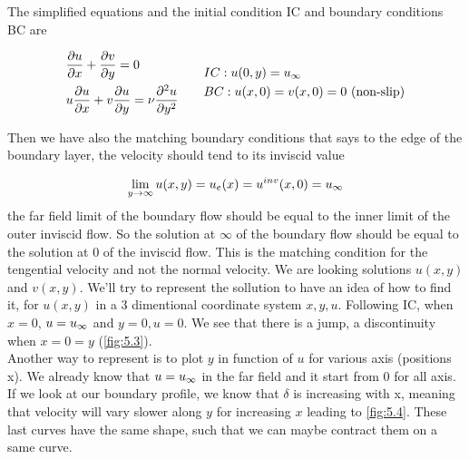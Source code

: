 	\newpage
	The simplified equations and the initial condition IC and boundary conditions BC are
	
	\begin{equation}
	\begin{aligned}
		&\frac{\partial u}{\partial x} + \frac{\partial v}{\partial y} = 0\\
		&u \frac{\partial u}{\partial x} + v \frac{\partial u}{\partial y} = \nu \frac{\partial ^2 u}{\partial y^2}
	\end{aligned}	
	\qquad
	\begin{aligned}
	&IC: u(0,y) = u_\infty\\
	&BC: u(x,0) = v(x,0) = 0 \mbox{ (non-slip)}
	\end{aligned}
	\end{equation}
	
	Then we have also the matching boundary conditions that says to the edge of the boundary layer, the velocity should tend to its inviscid value
	
	\begin{equation}
		\lim _{y\rightarrow \infty} u(x,y) = u_e(x) = u^{inv}(x,0) = u_\infty 
	\end{equation}
	the far field limit of the boundary flow should be equal to the inner limit of the outer inviscid flow. So the solution at $\infty$ of the boundary flow should be equal to the solution at 0 of the inviscid flow. This is the matching condition for the tengential velocity and not the normal velocity. We are looking solutions $u(x,y)$ and $v(x,y)$. We'll try to represent the sollution to have an idea of how to find it, for $u(x,y)$ in a 3 dimentional coordinate system $x, y, u$. Following IC, when $x=0$, $u = u_\infty$ and $y = 0, u=0$. We see that there is a jump, a discontinuity when $x=0=y$ (\autoref{fig:5.3}).\\
	
	 Another way to represent is to plot $y$ in function of $u$ for various axis (positions x). We already know that $u = u_\infty$ in the far field and it start from 0 for all axis. If we look at our boundary profile, we know that $\delta$ is increasing with x, meaning that velocity will vary slower along $y$ for increasing $x$ leading to \autoref{fig:5.4}. These last curves have the same shape, such that we can maybe contract them on a same curve. 
	 
